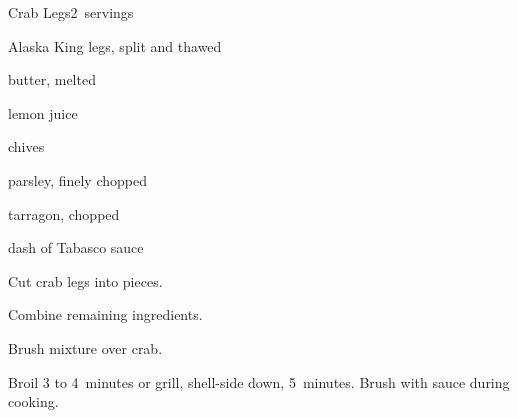 \begin{recipe}{Crab Legs}{}{2~servings}

\begin{ingredients}
\item {} Alaska King  legs, split and thawed
\item \C{\quarter} butter, melted
\item {} lemon juice
\item {} chives
\item {} parsley, finely chopped
\item \tp{\quarter} tarragon, chopped
\item dash of Tabasco sauce
\end{ingredients}

\begin{directions}
\item Cut crab legs into  pieces.
\item Combine remaining ingredients.
\item Brush mixture over crab.
\item Broil 3 to 4~minutes or grill, shell-side down, 5~minutes. Brush with sauce during cooking.
\end{directions}

\end{recipe}
